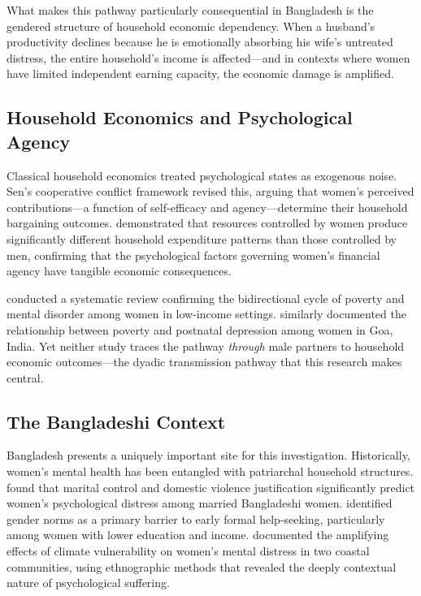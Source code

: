 \documentclass[12pt, a4paper]{article}
\begin{document}
What makes this pathway particularly consequential in Bangladesh is the gendered structure of household economic dependency. When a husband's productivity declines because he is emotionally absorbing his wife's untreated distress, the entire household's income is affected—and in contexts where women have limited independent earning capacity, the economic damage is amplified.

\subsection{Household Economics and Psychological Agency}

Classical household economics \citep{becker1981, chiappori1988} treated psychological states as exogenous noise. Sen's cooperative conflict framework \citep{sen1990} revised this, arguing that women's perceived contributions—a function of self-efficacy and agency—determine their household bargaining outcomes. \citet{duflo2003} demonstrated that resources controlled by women produce significantly different household expenditure patterns than those controlled by men, confirming that the psychological factors governing women's financial agency have tangible economic consequences.

\citet{lund2011} conducted a systematic review confirming the bidirectional cycle of poverty and mental disorder among women in low-income settings. \citet{patel2007} similarly documented the relationship between poverty and postnatal depression among women in Goa, India. Yet neither study traces the pathway \emph{through} male partners to household economic outcomes—the dyadic transmission pathway that this research makes central.

\subsection{The Bangladeshi Context}

Bangladesh presents a uniquely important site for this investigation. Historically, women's mental health has been entangled with patriarchal household structures. \citet{islam2025} found that marital control and domestic violence justification significantly predict women's psychological distress among married Bangladeshi women. \citet{akter2025} identified gender norms as a primary barrier to early formal help-seeking, particularly among women with lower education and income. \citet{hossain2024} documented the amplifying effects of climate vulnerability on women's mental distress in two coastal communities, using ethnographic methods that revealed the deeply contextual nature of psychological suffering.
\end{document}
